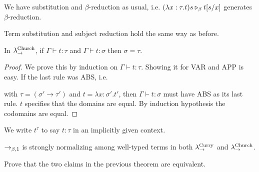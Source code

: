 \begin{rem}
    We have substitution and $\beta$-reduction as usual, i.e. $(\lambda x : \tau . t)s \becont t[s/x]$ generates $\beta$-reduction.
\end{rem}

\begin{rem}
    Term substitution and subject reduction hold the same way as before.
\end{rem}

\begin{boxprop}
    In $\lamchu$, if $\Gamma \vdash t : \tau$ and $\Gamma \vdash t : \sigma$ then $\sigma = \tau$.
\end{boxprop}
\begin{proof}
    We prove this by induction on $\Gamma \vdash t : \tau$.
    Showing it for VAR and APP is easy.
    If the last rule was ABS, i.e.
    \begin{prooftree}
    \end{prooftree}
    with $\tau = (\sigma' \to \tau')$ and $t = \lambda x : \sigma'. t'$,
    then $\Gamma \vdash t : \sigma$ must have ABS as its last rule.
    $t$ specifies that the domains are equal.
    By induction hypothesis the codomains are equal.
\end{proof}

\begin{rem}
    We write $t^\tau$ to say $t : \tau$ in an implicitly given context.
\end{rem}

\begin{boxthm}\label{thm:typedSN}
    $\beored$ is strongly normalizing among well-typed terms in both $\lamcur$ and $\lamchu$.
\end{boxthm}

\begin{exercise}
    Prove that the two claims in the previous theorem are equivalent.
\end{exercise}

